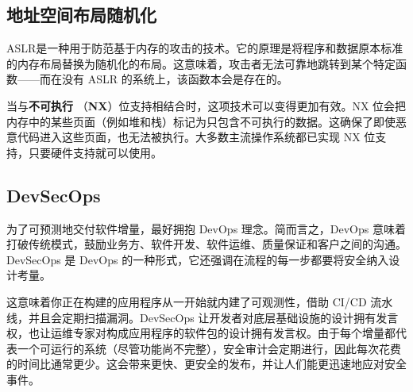 \subsection{地址空间布局随机化}

\label{idx:1152}
ASLR是一种用于防范基于内存的攻击的技术。它的原理是将程序和数据原本标准的内存布局替换为随机化的布局。这意味着，攻击者无法可靠地跳转到某个特定函数——而在没有 ASLR 的系统上，该函数本会是存在的。


\label{idx:1153}
当与\textbf{不可执行 }（\textbf{NX}）位支持相结合时，这项技术可以变得更加有效。NX 位会把内存中的某些页面（例如堆和栈）标记为只包含不可执行的数据。这确保了即使恶意代码进入这些页面，也无法被执行。大多数主流操作系统都已实现 NX 位支持，只要硬件支持就可以使用。

\subsection{DevSecOps}

\label{idx:1154}
为了可预测地交付软件增量，最好拥抱 DevOps 理念。简而言之，DevOps 意味着打破传统模式，鼓励业务方、软件开发、软件运维、质量保证和客户之间的沟通。DevSecOps 是 DevOps 的一种形式，它还强调在流程的每一步都要将安全纳入设计考量。

这意味着你正在构建的应用程序从一开始就内建了可观测性，借助 CI/CD 流水线，并且会定期扫描漏洞。DevSecOps 让开发者对底层基础设施的设计拥有发言权，也让运维专家对构成应用程序的软件包的设计拥有发言权。由于每个增量都代表一个可运行的系统（尽管功能尚不完整），安全审计会定期进行，因此每次花费的时间比通常更少。这会带来更快、更安全的发布，并让人们能更迅速地应对安全事件。

